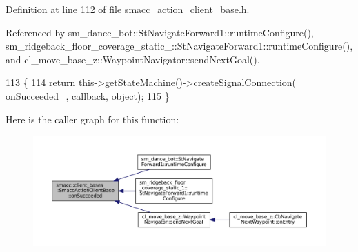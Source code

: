 Definition at line 112 of file smacc\+\_\+action\+\_\+client\+\_\+base.\+h.



Referenced by sm\+\_\+dance\+\_\+bot\+::\+St\+Navigate\+Forward1\+::runtime\+Configure(), sm\+\_\+ridgeback\+\_\+floor\+\_\+coverage\+\_\+static\+\_\+::\+St\+Navigate\+Forward1\+::runtime\+Configure(), and cl\+\_\+move\+\_\+base\+\_\+z\+::\+Waypoint\+Navigator\+::send\+Next\+Goal().


\begin{DoxyCode}
113     \{
114         \textcolor{keywordflow}{return} this->\hyperlink{classsmacc_1_1ISmaccClient_aec51d4712404cb9882b86e4c854bb93a}{getStateMachine}()->\hyperlink{classsmacc_1_1ISmaccStateMachine_adf0f42ade0c65cc471960fe2a7c42da2}{createSignalConnection}(
      \hyperlink{classsmacc_1_1client__bases_1_1SmaccActionClientBase_afa1d615e16c9e825d815a3a3ccaa61df}{onSucceeded\_}, \hyperlink{sm__ridgeback__barrel__search__1_2servers_2opencv__perception__node_2opencv__perception__node_8cpp_a050e697bd654facce10ea3f6549669b3}{callback}, \textcolor{keywordtype}{object});
115     \}
\end{DoxyCode}
Here is the caller graph for this function\+:
\nopagebreak
\begin{figure}[H]
\begin{center}
\leavevmode
\includegraphics[width=350pt]{classsmacc_1_1client__bases_1_1SmaccActionClientBase_af6d77c27d21b2e4f621f53c5f1df088b_icgraph}
\end{center}
\end{figure}
\mbox{\label{classsmacc_1_1client__bases_1_1SmaccActionClientBase_a92053df4ebfd0e49bbbd4ba191bf3975}} 
